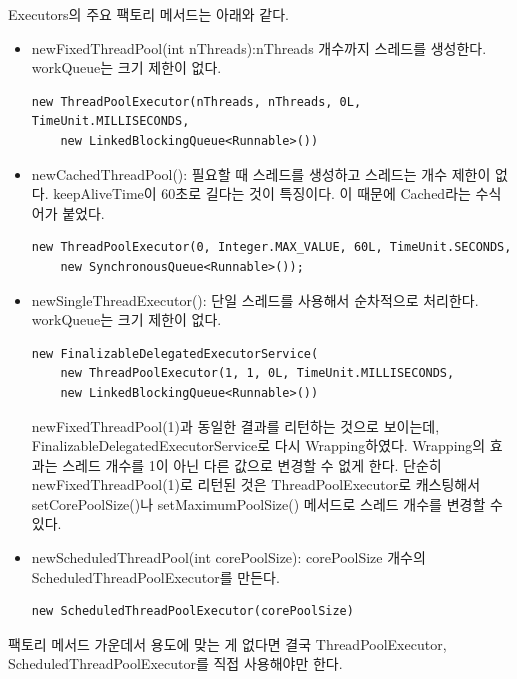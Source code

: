 Executors의 주요 팩토리 메서드는 아래와 같다.
\begin{itemize}

\item newFixedThreadPool(int nThreads):nThreads 개수까지 스레드를  생성한다. workQueue는 크기 제한이 없다.
\begin{lstlisting}[frame=single] 
new ThreadPoolExecutor(nThreads, nThreads, 0L, TimeUnit.MILLISECONDS, 
    new LinkedBlockingQueue<Runnable>())
\end{lstlisting}

\item newCachedThreadPool(): 필요할 때 스레드를 생성하고 스레드는 개수 제한이 없다. keepAliveTime이 60초로 길다는 것이 특징이다. 이 때문에 Cached라는 수식어가 붙었다.
\begin{lstlisting}[frame=single] 
new ThreadPoolExecutor(0, Integer.MAX_VALUE, 60L, TimeUnit.SECONDS, 
    new SynchronousQueue<Runnable>());
\end{lstlisting}

\item newSingleThreadExecutor(): 단일 스레드를 사용해서 순차적으로 처리한다. workQueue는 크기 제한이 없다. 
\begin{lstlisting}[frame=single] 
new FinalizableDelegatedExecutorService(
	new ThreadPoolExecutor(1, 1, 0L, TimeUnit.MILLISECONDS, 
	new LinkedBlockingQueue<Runnable>())
\end{lstlisting}
newFixedThreadPool(1)과 동일한 결과를 리턴하는 것으로 보이는데,  FinalizableDelegatedExecutorService로 다시 Wrapping하였다. 
Wrapping의 효과는 스레드 개수를 1이 아닌 다른 값으로 변경할 수 없게 한다. 
단순히 newFixedThreadPool(1)로 리턴된 것은 ThreadPoolExecutor로 캐스팅해서 setCorePoolSize()나 setMaximumPoolSize() 메서드로 스레드 개수를 변경할 수 있다.

\item newScheduledThreadPool(int corePoolSize): corePoolSize 개수의 ScheduledThreadPoolExecutor를 만든다.
\begin{lstlisting}[frame=single] 
new ScheduledThreadPoolExecutor(corePoolSize)
\end{lstlisting}

\end{itemize}

팩토리 메서드 가운데서 용도에 맞는 게 없다면 결국 ThreadPoolExecutor, ScheduledThreadPoolExecutor를 직접 사용해야만 한다.

